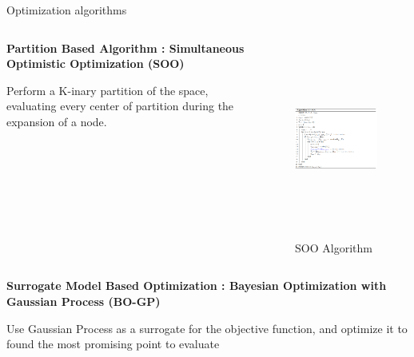 \begin{frame}[allowframebreaks]{Optimization algorithms}

    \begin{columns}
        \begin{column}[b]{0.4\textwidth}
            \textbf{Partition Based Algorithm : Simultaneous Optimistic Optimization (SOO)}

            Perform a K-inary partition of the space, evaluating every center of partition during the expansion of a node.
            
        \end{column}        
        \begin{column}{0.6\textwidth}
            \begin{figure}[h]
                \centering
                \includegraphics[trim={0 0 7cm 0},clip,height = 6.5cm]{imgs/algo/soo.png}
                \caption{SOO Algorithm}
            \end{figure}
        \end{column}
    \end{columns}

    \framebreak

    \begin{columns}
        \begin{column}{0.3\textwidth}
            \textbf{Surrogate Model Based Optimization : Bayesian Optimization with Gaussian Process (BO-GP)}

            Use Gaussian Process as a surrogate for the objective function, and optimize it to found the most promising point to evaluate
            

\end{column}
\end{columns}
\end{frame}
